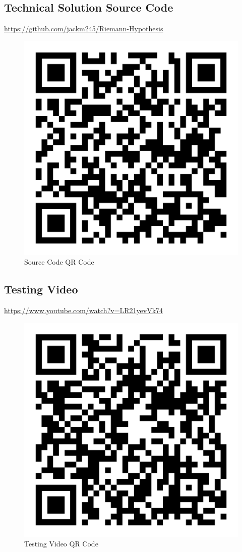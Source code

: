 \documentclass[12pt]{article}
\begin{document}
\subsection{Technical Solution Source Code}
\url{https://github.com/jackm245/Riemann-Hypothesis}
\begin{figure}[h]
    \centering
    \includegraphics[scale=0.1]{source-code-qr-code}
    \caption{Source Code QR Code}
\end{figure}
\subsection{Testing Video}
\url{https://www.youtube.com/watch?v=LR21yevVk74}
\begin{figure}[h]
    \centering
    \includegraphics[scale=0.1]{testing-video-qr-code}
    \caption{Testing Video QR Code}
\end{figure}
\clearpage
\nocite{*}
\printbibliography
{}
\end{document}
